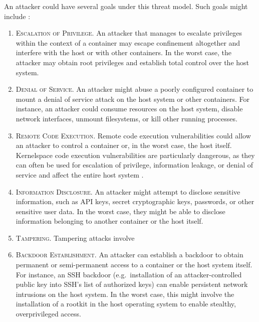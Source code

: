 An attacker could have several goals under this threat model. Such goals might include \cite{sultan2019_container_security,xin2018_container_security}:
\begin{enumerate}[label=\bfseries AG\arabic*., ref=AG\arabic*, labelindent=1em]
  \item \textsc{Escalation of Privilege.}
    An attacker that manages to escalate privileges within the context of a container may escape confinement altogether and interfere with the host or with other containers. In the worst case, the attacker may obtain root privileges and establish total control over the host system.

  \item \textsc{Denial of Service.}
    An attacker might abuse a poorly configured container to mount a denial of service attack on the host system or other containers. For instance, an attacker could consume resources on the host system, disable network interfaces, unmount filesystems, or kill other running processes.

  \item \textsc{Remote Code Execution.}
    Remote code execution vulnerabilities could allow an attacker to control a container or, in the worst case, the host itself. Kernelspace code execution vulnerabilities are particularly dangerous, as they can often be used for escalation of privilege, information leakage, or denial of service and affect the entire host system \cite{sultan2019_container_security, xin2018_container_security}.

  \item \textsc{Information Disclosure.}
    An attacker might attempt to disclose sensitive information, such as API keys, secret cryptographic keys, passwords, or other sensitive user data. In the worst case, they might be able to disclose information belonging to another container or the host itself.

  \item \textsc{Tampering.}
    Tampering attacks involve 

  \item \textsc{Backdoor Establishment.}
    An attacker can establish a backdoor to obtain permanent or semi-permanent access to a container or the host system itself. For instance, an SSH backdoor (e.g.~installation of an attacker-controlled public key into SSH's list of authorized keys) can enable persistent network intrusions on the host system. In the worst case, this might involve the installation of a rootkit \cite{beegle2007_rootkit} in the host operating system to enable stealthy, overprivileged access.
\end{enumerate}

